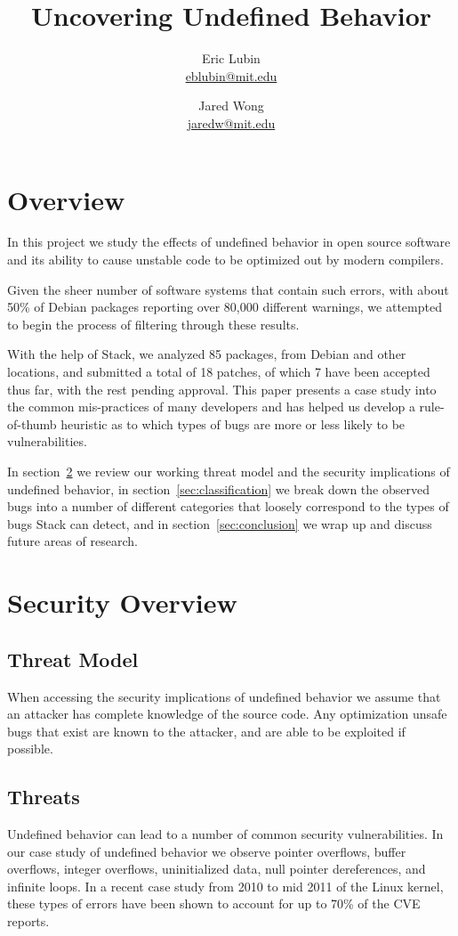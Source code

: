 \documentclass[10pt,twocolumn]{article}
\title{Uncovering Undefined Behavior}
\author{
    Eric Lubin\\
    \href{mailto:eblubin@mit.edu}{eblubin@mit.edu}
\and
    Jared Wong\\
    \href{mailto:jaredw@mit.edu}{jaredw@mit.edu}
}
\newcommand{\NumPackages}{85 }
\newcommand{\NumPatches}{18 }
\newcommand{\NumPatchesAccepted}{7 }
\begin{document}
\maketitle

\section{Overview}
In this project we study the effects of undefined behavior in open source software
and its ability to cause unstable code to be optimized out by modern compilers.

Given the sheer number of software systems that contain such errors, 
with about 50\% of Debian packages reporting over 80,000 different warnings,
we attempted to begin the process of filtering through these results. 

With the help of Stack\cite{stack}, we analyzed \NumPackages packages, from
Debian and other locations, and submitted a total of \NumPatches patches, of
which \NumPatchesAccepted have been accepted thus far, with the rest pending
approval. This paper presents a case study into the common mis-practices of
many developers and has helped us develop a rule-of-thumb heuristic as to which
types of bugs are more or less likely to be vulnerabilities.

In section~\ref{sec:security} we review our working threat model and the
security implications of undefined behavior, in
section~\ref{sec:classification} we break down the observed bugs into a number
of different categories that loosely correspond to the types of bugs Stack
can detect, and in section~\ref{sec:conclusion} we wrap up and discuss future
areas of research.

\section{Security Overview}
\label{sec:security}
\subsection{Threat Model}
When accessing the security implications of undefined behavior we assume that
an attacker has complete knowledge of the source code. Any optimization unsafe
bugs that exist are known to the attacker, and are able to be exploited if
possible.

\subsection{Threats}
Undefined behavior can lead to a number of common security vulnerabilities. In
our case study of undefined behavior we observe pointer overflows, buffer
overflows, integer overflows, uninitialized data, null pointer dereferences,
and infinite loops. In a recent case study from 2010 to mid 2011
\cite{chen-kbugs} of the Linux kernel, these types of errors have been shown to
account for up to 70\% of the CVE reports.
\end{document}
